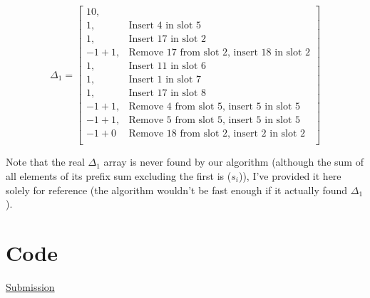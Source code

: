 \documentclass{article}
\begin{document}
$$
\Delta_1 = \left[
\begin{array}{ll}
10, \\
1, & \text{{Insert 4 in slot 5}} \\
1, & \text{{Insert 17 in slot 2}} \\
-1+1, & \text{{Remove 17 from slot 2, insert 18 in slot 2}} \\
1, & \text{{Insert 11 in slot 6}} \\
1, & \text{{Insert 1 in slot 7}} \\
1, & \text{{Insert 17 in slot 8}} \\
-1+1, & \text{{Remove 4 from slot 5, insert 5 in slot 5}} \\
-1+1, & \text{{Remove 5 from slot 5, insert 5 in slot 5}} \\
-1+0 & \text{{Remove 18 from slot 2, insert 2 in slot 2}} \\
\end{array}
\right]
$$

Note that the real $\Delta_1$ array is never found by our algorithm (although the sum of all elements of its prefix sum excluding the first is ($s_i$)), I've provided it here solely for reference (the algorithm wouldn't be fast enough if it actually found $\Delta_1$).

\section{Code}
\href{https://codeforces.com/contest/1789/submission/255600704}{Submission}
\end{document}
